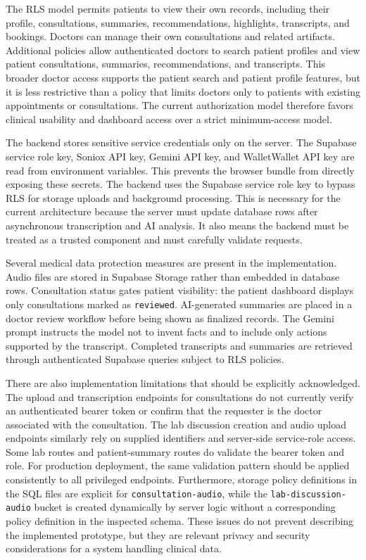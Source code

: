 The RLS model permits patients to view their own records, including their profile, consultations, summaries, recommendations, highlights, transcripts, and bookings. Doctors can manage their own consultations and related artifacts. Additional policies allow authenticated doctors to search patient profiles and view patient consultations, summaries, recommendations, and transcripts. This broader doctor access supports the patient search and patient profile features, but it is less restrictive than a policy that limits doctors only to patients with existing appointments or consultations. The current authorization model therefore favors clinical usability and dashboard access over a strict minimum-access model.

The backend stores sensitive service credentials only on the server. The Supabase service role key, Soniox API key, Gemini API key, and WalletWallet API key are read from environment variables. This prevents the browser bundle from directly exposing these secrets. The backend uses the Supabase service role key to bypass RLS for storage uploads and background processing. This is necessary for the current architecture because the server must update database rows after asynchronous transcription and AI analysis. It also means the backend must be treated as a trusted component and must carefully validate requests.

Several medical data protection measures are present in the implementation. Audio files are stored in Supabase Storage rather than embedded in database rows. Consultation status gates patient visibility: the patient dashboard displays only consultations marked as \texttt{reviewed}. AI-generated summaries are placed in a doctor review workflow before being shown as finalized records. The Gemini prompt instructs the model not to invent facts and to include only actions supported by the transcript. Completed transcripts and summaries are retrieved through authenticated Supabase queries subject to RLS policies.

There are also implementation limitations that should be explicitly acknowledged. The upload and transcription endpoints for consultations do not currently verify an authenticated bearer token or confirm that the requester is the doctor associated with the consultation. The lab discussion creation and audio upload endpoints similarly rely on supplied identifiers and server-side service-role access. Some lab routes and patient-summary routes do validate the bearer token and role. For production deployment, the same validation pattern should be applied consistently to all privileged endpoints. Furthermore, storage policy definitions in the SQL files are explicit for \texttt{consultation-audio}, while the \texttt{lab-discussion-audio} bucket is created dynamically by server logic without a corresponding policy definition in the inspected schema. These issues do not prevent describing the implemented prototype, but they are relevant privacy and security considerations for a system handling clinical data.

